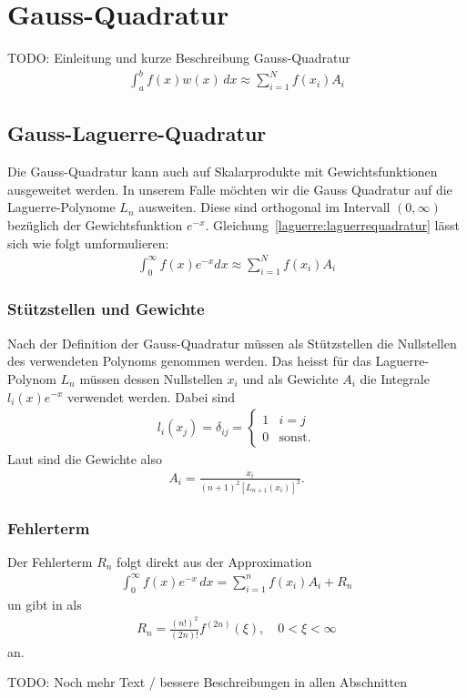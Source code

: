 %
%
%
\section{Gauss-Quadratur
  \label{laguerre:section:quadratur}}
 {\large \color{red} TODO: Einleitung und kurze Beschreibung Gauss-Quadratur}
\begin{align}
\int_a^b f(x) w(x) \, dx
\approx
\sum_{i=1}^N f(x_i) A_i
\label{laguerre:gaussquadratur}
\end{align}

\subsection{Gauss-Laguerre-Quadratur
\label{laguerre:subsection:gausslag-quadratur}}
Die Gauss-Quadratur kann auch auf Skalarprodukte mit Gewichtsfunktionen
ausgeweitet werden.
In unserem Falle möchten wir die Gauss Quadratur auf die Laguerre-Polynome
$L_n$ ausweiten.
Diese sind orthogonal im Intervall $(0, \infty)$ bezüglich
der Gewichtsfunktion $e^{-x}$.
Gleichung~\eqref{laguerre:laguerrequadratur} lässt sich wie folgt umformulieren:
\begin{align}
\int_{0}^{\infty} f(x) e^{-x} dx
\approx
\sum_{i=1}^{N} f(x_i) A_i
\label{laguerre:laguerrequadratur}
\end{align}

\subsubsection{Stützstellen und Gewichte}
Nach der Definition der Gauss-Quadratur müssen als Stützstellen die Nullstellen
des verwendeten Polynoms genommen werden.
Das heisst für das Laguerre-Polynom $L_n$ müssen dessen Nullstellen $x_i$ und
als Gewichte $A_i$ die Integrale $l_i(x)e^{-x}$ verwendet werden.
Dabei sind
\begin{align*}
l_i(x_j)
=
\delta_{ij}
=
\begin{cases}
1 & i=j           \\
0 & \text{sonst.}
\end{cases}
\end{align*}
Laut \cite{abramowitz+stegun} sind die Gewichte also
\begin{align}
A_i
=
\frac{x_i}{(n + 1)^2 \left[ L_{n + 1}(x_i)\right]^2}
.
\label{laguerre:quadratur_gewichte}
\end{align}

\subsubsection{Fehlerterm}
Der Fehlerterm $R_n$ folgt direkt aus der Approximation
\begin{align*}
\int_0^{\infty} f(x) e^{-x} \, dx
=
\sum_{i=1}^n f(x_i) A_i + R_n
\end{align*}
un \cite{abramowitz+stegun} gibt in als
\begin{align}
R_n
=
\frac{(n!)^2}{(2n)!} f^{(2n)}(\xi)
,\quad
0 < \xi < \infty
\label{lagurre:lag_error}
\end{align}
an.

{
\large \color{red}
TODO:
Noch mehr Text / bessere Beschreibungen in allen Abschnitten
}
